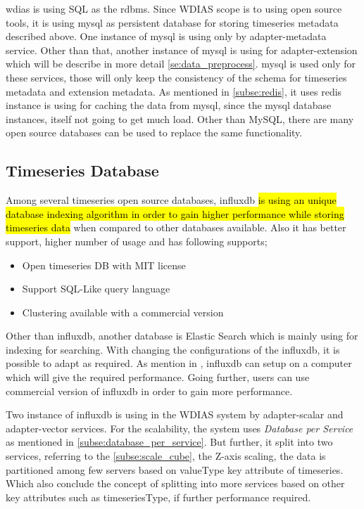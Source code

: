 \acrshort{wdias} is using SQL as the \acrfull{rdbms}. 
Since WDIAS scope is to using open source tools, it is using \acrshort{mysql} as persistent database for storing timeseries metadata described above.
One instance of \acrshort{mysql} is using only by adapter-metadata service.
Other than that, another instance of \acrshort{mysql} is using for adapter-extension which will be describe in more detail \cref{se:data_preprocess}.
\acrshort{mysql} is used only for these services, those will only keep the consistency of the schema for timeseries metadata and extension metadata.
As mentioned in \cref{subse:redis}, it uses \acrshort{redis} instance is using for caching the data from \acrshort{mysql}, since the \acrshort{mysql} database instances, itself not going to get much load.
Other than MySQL, there are many open source databases can be used to replace the same functionality.

\subsection{Timeseries Database}
\label{subse:influxdb}
Among several timeseries open source databases, \acrshort{influxdb} \cite{influxdbInfluxDBDocumentation} \hl{is using an unique database indexing algorithm in order to gain higher performance while storing timeseries data} when compared to other databases available. Also it has better support, higher number of usage and has following supports;
\begin{itemize}
  \item Open timeseries DB with MIT license
  \item Support SQL-Like query language
  \item Clustering available with a commercial version
\end{itemize}
Other than \acrshort{influxdb}, another database is Elastic Search which is mainly using for indexing for searching.
With changing the configurations of the \acrshort{influxdb}, it is possible to adapt as required. As mention in \cite{influxdbInfluxDBDocumentation}, 
\acrshort{influxdb} can setup on a computer which will give the required performance. Going further, users can use commercial version of \acrshort{influxdb} in order to gain more performance.

Two instance of \acrshort{influxdb} is using in the WDIAS system by adapter-scalar and adapter-vector services. For the scalability, the system uses \emph{Database per Service} as mentioned in \cref{subse:database_per_service}.
But further, it split into two services, referring to the \cref{subse:scale_cube}, the Z-axis scaling, the data is partitioned among few servers based on valueType key attribute of timeseries.
Which also conclude the concept of splitting into more services based on other key attributes such as timeseriesType, if further performance required.

